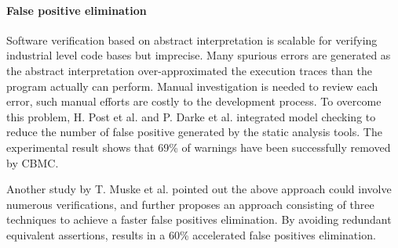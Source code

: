 



\paragraph{False positive elimination}
Software verification based on abstract interpretation is scalable for verifying industrial level code bases but imprecise. Many spurious errors are generated as the abstract interpretation over-approximated the execution traces than the program actually can perform. Manual investigation is needed to review each error, such manual efforts are costly to the development process. To overcome this problem, 
H. Post et al. \cite{4639322} and P. Darke et al. \cite{Kumar:2013:PRA:2491411.2494569} integrated model checking to reduce the number of false positive generated by the static analysis tools. The experimental result shows that 69\% of warnings have been successfully removed by CBMC. 


Another study by T. Muske et al. \cite{tukaram2013efficient} pointed out the above approach could involve numerous verifications, and further proposes an approach consisting of three techniques to achieve a faster false positives elimination. By avoiding redundant equivalent assertions, results in a 60\% accelerated false positives elimination. 

